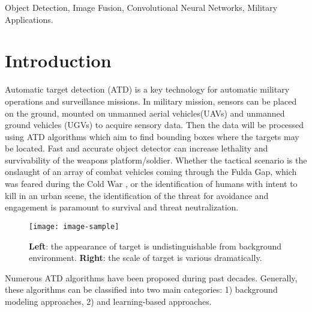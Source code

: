 \documentclass[journal]{IEEEtran}
\begin{document}
\begin{IEEEkeywords} Object Detection, Image Fusion, Convolutional Neural Networks, Military Applications.
\end{IEEEkeywords}

\markboth{}%
{}


\section{Introduction}
Automatic target detection (ATD) is a key technology for automatic military operations and surveillance missions. In military mission, sensors can be placed on the ground, mounted on unmanned aerial vehicles(UAVs) and unmanned ground vehicles (UGVs) to acquire sensory data. Then the data will be processed using ATD algorithms which aim to find bounding boxes where the targets may be located. Fast and accurate object detector can increase lethality and survivability of the weapons platform/soldier. Whether the tactical scenario is the onslaught of an array of combat vehicles coming through the Fulda Gap, which was feared during the Cold War \cite{Ratches2011ReviewTasks}, or the identification of humans with intent to kill in an urban scene, the identification of the threat for avoidance and engagement is paramount to survival and threat neutralization.

\begin{figure}
\centering
\texttt{[image: image-sample]}
\caption{\textbf{Left}: the appearance of target is undistinguishable from background environment. \textbf{Right}: the scale of target is various dramatically. }
\label{image-sample}
\end{figure}

Numerous ATD algorithms have been proposed during past decades. Generally, these algorithms can be classified into two main categories: 1) background modeling approaches, 2) and learning-based approaches. 
\end{document}
